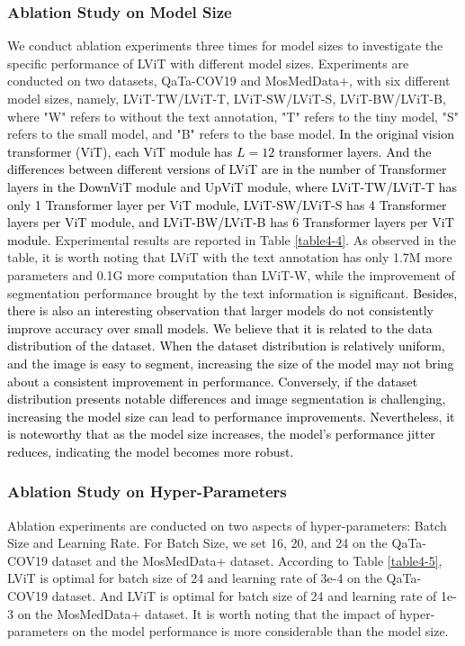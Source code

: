 \documentclass[lettersize,journal]{IEEEtran}
\begin{document}
\subsubsection{Ablation Study on Model Size}
We conduct ablation experiments three times for model sizes to investigate the specific performance of LViT with different model sizes. Experiments are conducted on two datasets, QaTa-COV19 and MosMedData+, with six different model sizes, namely, LViT-TW/LViT-T, LViT-SW/LViT-S, LViT-BW/LViT-B, where "W" refers to without the text annotation, "T" refers to the tiny model, "S" refers to the small model, and "B" refers to the base model. 
\textcolor{black}{In the original vision transformer (ViT)\cite{42dosovitskiy2020image}, each ViT module has $L=12$ transformer layers. And the differences between different versions of LViT are in the number of Transformer layers in the DownViT module and UpViT module, where LViT-TW/LViT-T has only 1 Transformer layer per ViT module, LViT-SW/LViT-S has 4 Transformer layers per ViT module, and LViT-BW/LViT-B has 6 Transformer layers per ViT module.} Experimental results are reported in Table \ref{table4-4}.
As observed in the table, it is worth noting that LViT with the text annotation has only 1.7M more parameters and 0.1G more computation than LViT-W, while the improvement of segmentation performance brought by the text information is significant. 
\textcolor{black}{
Besides, there is also an interesting observation that larger models do not consistently improve accuracy over small models. We believe that it is related to the data distribution of the dataset. When the dataset distribution is relatively uniform, and the image is easy to segment, increasing the size of the model may not bring about a consistent improvement in performance. Conversely, if the dataset distribution presents notable differences and image segmentation is challenging, increasing the model size can lead to performance improvements. Nevertheless, it is noteworthy that as the model size increases, the model's performance jitter reduces, indicating the model becomes more robust.}

\subsubsection{Ablation Study on Hyper-Parameters}
Ablation experiments are conducted on two aspects of hyper-parameters: Batch Size and Learning Rate. For Batch Size, we set 16, 20, and 24 on the QaTa-COV19 dataset and the MosMedData+ dataset. According to Table \ref{table4-5}, LViT is optimal for batch size of 24 and learning rate of 3e-4 on the QaTa-COV19 dataset. And LViT is optimal for batch size of 24 and learning rate of 1e-3 on the MosMedData+ dataset. It is worth noting that the impact of hyper-parameters on the model performance is more considerable than the model size.
\end{document}
